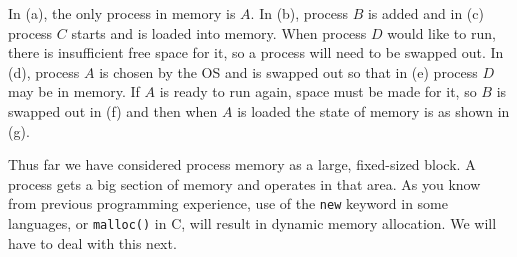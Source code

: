 In (a), the only process in memory is $A$. In (b), process $B$ is added and in (c) process $C$ starts and is loaded into memory. When process $D$ would like to run, there is insufficient free space for it, so a process will need to be swapped out. In (d), process $A$ is chosen by the OS and is swapped out so that in (e) process $D$ may be in memory. If $A$ is ready to run again, space must be made for it, so $B$ is swapped out in (f) and then when $A$ is loaded the state of memory is as shown in (g).

Thus far we have considered process memory as a large, fixed-sized block. A process gets a big section of memory and operates in that area. As you know from previous programming experience, use of the \texttt{new} keyword in some languages, or \texttt{malloc()} in C, will result in dynamic memory allocation. We will have to deal with this next.




